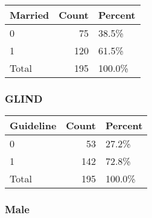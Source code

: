 \documentclass[]{article}
\newenvironment{Shaded}{\begin{snugshade}}{\end{snugshade}}
\newcommand{\DataTypeTok}[1]{\textcolor[rgb]{0.13,0.29,0.53}{#1}}
\newcommand{\KeywordTok}[1]{\textcolor[rgb]{0.13,0.29,0.53}{\textbf{#1}}}
\newcommand{\NormalTok}[1]{#1}
\newcommand{\OperatorTok}[1]{\textcolor[rgb]{0.81,0.36,0.00}{\textbf{#1}}}
\newcommand{\OtherTok}[1]{\textcolor[rgb]{0.56,0.35,0.01}{#1}}
\newcommand{\StringTok}[1]{\textcolor[rgb]{0.31,0.60,0.02}{#1}}
\begin{document}
\begin{table}[H]
\centering
\begin{tabular}{l|r|l}
\hline
Married & Count & Percent\\
\hline
0 & 75 & 38.5\%\\
\hline
1 & 120 & 61.5\%\\
\hline
Total & 195 & 100.0\%\\
\hline
\end{tabular}
\end{table}

\hypertarget{glind}{%
\subsubsection{GLIND}\label{glind}}

\begin{Shaded}
\end{Shaded}

\begin{table}[H]
\centering
\begin{tabular}{l|r|l}
\hline
Guideline & Count & Percent\\
\hline
0 & 53 & 27.2\%\\
\hline
1 & 142 & 72.8\%\\
\hline
Total & 195 & 100.0\%\\
\hline
\end{tabular}
\end{table}

\hypertarget{male-1}{%
\subsubsection{Male}\label{male-1}}
\end{document}
